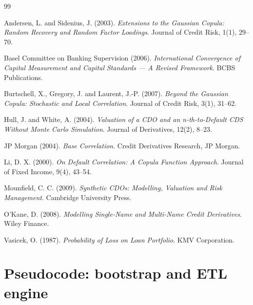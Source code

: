 \documentclass[11pt,a4paper]{article}
\newcommand{\1}{\mathbf{1}}
\begin{document}
\bigskip
\begin{thebibliography}{99}

Andersen, L. and Sidenius, J. (2003).
\emph{Extensions to the Gaussian Copula: Random Recovery and Random
Factor Loadings}. Journal of Credit Risk, 1(1), 29--70.

Basel Committee on Banking Supervision (2006).
\emph{International Convergence of Capital Measurement and Capital
Standards --- A Revised Framework}. BCBS Publications.

Burtschell, X., Gregory, J. and Laurent, J.-P. (2007).
\emph{Beyond the Gaussian Copula: Stochastic and Local Correlation}.
Journal of Credit Risk, 3(1), 31--62.

Hull, J. and White, A. (2004). \emph{Valuation of a CDO and an
n-th-to-Default CDS Without Monte Carlo Simulation}. Journal of
Derivatives, 12(2), 8--23.

JP Morgan (2004). \emph{Base Correlation}. Credit Derivatives
Research, JP Morgan.

Li, D. X. (2000).
\emph{On Default Correlation: A Copula Function Approach}.
Journal of Fixed Income, 9(4), 43--54.

Mounfield, C. C. (2009). \emph{Synthetic CDOs: Modelling, Valuation
and Risk Management}. Cambridge University Press.

O'Kane, D. (2008). \emph{Modelling Single-Name and Multi-Name Credit
Derivatives}. Wiley Finance.

Vasicek, O. (1987). \emph{Probability of Loss on Loan Portfolio}.
KMV Corporation.

\end{thebibliography}

\appendix
\section{Pseudocode: bootstrap and ETL engine}\label{app:pseudo}
\end{document}
